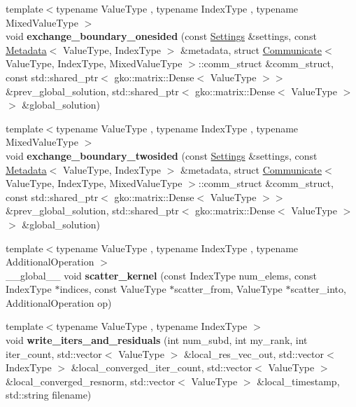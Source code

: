 \begin{DoxyCompactItemize}
\item 
\mbox{\label{namespaceschwz_a3ca248698ba2885cac5b477083f44505}} 
{\footnotesize template$<$typename Value\+Type , typename Index\+Type , typename Mixed\+Value\+Type $>$ }\\void {\bfseries exchange\+\_\+boundary\+\_\+onesided} (const \hyperlink{structschwz_1_1Settings}{Settings} \&settings, const \hyperlink{structschwz_1_1Metadata}{Metadata}$<$ Value\+Type, Index\+Type $>$ \&metadata, struct \hyperlink{classschwz_1_1Communicate}{Communicate}$<$ Value\+Type, Index\+Type, Mixed\+Value\+Type $>$\+::comm\+\_\+struct \&comm\+\_\+struct, const std\+::shared\+\_\+ptr$<$ gko\+::matrix\+::\+Dense$<$ Value\+Type $>$$>$ \&prev\+\_\+global\+\_\+solution, std\+::shared\+\_\+ptr$<$ gko\+::matrix\+::\+Dense$<$ Value\+Type $>$$>$ \&global\+\_\+solution)
\item 
\mbox{\label{namespaceschwz_a1f69ce81eaf85081073d0f45e11ce149}} 
{\footnotesize template$<$typename Value\+Type , typename Index\+Type , typename Mixed\+Value\+Type $>$ }\\void {\bfseries exchange\+\_\+boundary\+\_\+twosided} (const \hyperlink{structschwz_1_1Settings}{Settings} \&settings, const \hyperlink{structschwz_1_1Metadata}{Metadata}$<$ Value\+Type, Index\+Type $>$ \&metadata, struct \hyperlink{classschwz_1_1Communicate}{Communicate}$<$ Value\+Type, Index\+Type, Mixed\+Value\+Type $>$\+::comm\+\_\+struct \&comm\+\_\+struct, const std\+::shared\+\_\+ptr$<$ gko\+::matrix\+::\+Dense$<$ Value\+Type $>$$>$ \&prev\+\_\+global\+\_\+solution, std\+::shared\+\_\+ptr$<$ gko\+::matrix\+::\+Dense$<$ Value\+Type $>$$>$ \&global\+\_\+solution)
\item 
\mbox{\label{namespaceschwz_a1149b1cad510b1ae7285480c970fd2b3}} 
{\footnotesize template$<$typename Value\+Type , typename Index\+Type , typename Additional\+Operation $>$ }\\\+\_\+\+\_\+global\+\_\+\+\_\+ void {\bfseries scatter\+\_\+kernel} (const Index\+Type num\+\_\+elems, const Index\+Type $\ast$indices, const Value\+Type $\ast$scatter\+\_\+from, Value\+Type $\ast$scatter\+\_\+into, Additional\+Operation op)
\item 
\mbox{\label{namespaceschwz_af5437b273e3d364a2b3fa80929aeded9}} 
{\footnotesize template$<$typename Value\+Type , typename Index\+Type $>$ }\\void {\bfseries write\+\_\+iters\+\_\+and\+\_\+residuals} (int num\+\_\+subd, int my\+\_\+rank, int iter\+\_\+count, std\+::vector$<$ Value\+Type $>$ \&local\+\_\+res\+\_\+vec\+\_\+out, std\+::vector$<$ Index\+Type $>$ \&local\+\_\+converged\+\_\+iter\+\_\+count, std\+::vector$<$ Value\+Type $>$ \&local\+\_\+converged\+\_\+resnorm, std\+::vector$<$ Value\+Type $>$ \&local\+\_\+timestamp, std\+::string filename)

\end{DoxyCompactItemize}
